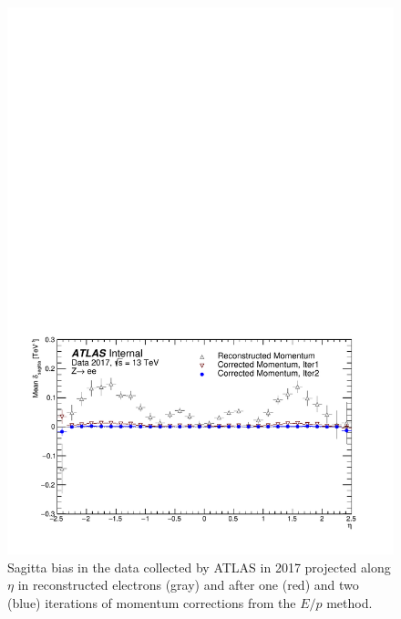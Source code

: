 \begin{figure}[htbp]
  \centering
  \includegraphics[width=.6\textwidth]{figs/alignment/eop/sagitta_2017_projection}
  \caption{Sagitta bias in the  data collected by ATLAS in 2017 projected along $\eta$ in reconstructed electrons (gray) and after one (red) and two (blue) iterations of momentum corrections from the $E/p$ method.}
  \label{fig:alignment_2017_sagitta_projection}
\end{figure}
